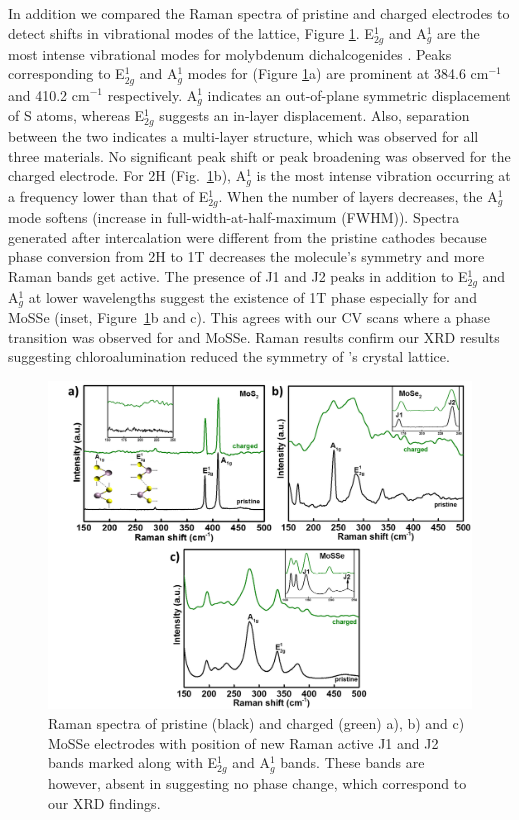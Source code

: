 In addition we compared the Raman spectra of pristine and charged electrodes to detect shifts in vibrational modes of the lattice, Figure \ref{Figures/chap4fig:raman}. E$^1_{2g}$ and A$^1_g$ are the most intense vibrational modes for molybdenum dichalcogenides \cite{yang_pressure-induced_2019, r_2d_2017,sharma_stable_2018}. Peaks corresponding to E$^1_{2g}$ and A$^1_g$ modes for  (Figure \ref{Figures/chap4fig:raman}a) are prominent at 384.6 cm$^{-1}$ and 410.2 cm$^{-1}$ respectively. A$^1_g$ indicates an out-of-plane symmetric displacement of S atoms, whereas E$^1_{2g}$ suggests an in-layer displacement. Also, separation between the two indicates a multi-layer structure, which was observed for all three materials. No significant peak shift or peak broadening was observed for the charged  electrode. For 2H (Fig.\ \ref{Figures/chap4fig:raman}b), A$^1_g$ is the most intense vibration occurring at a frequency lower than that of E$^1_{2g}$. When the number of layers decreases, the A$^1_g$ mode softens (increase in full-width-at-half-maximum (FWHM)). Spectra generated after intercalation were different from the pristine cathodes because phase conversion from 2H to 1T decreases the molecule's symmetry and more Raman bands get active. The presence of J1 and J2 peaks in addition to E$^1_{2g}$ and A$^1_g$ at lower wavelengths suggest the existence of 1T phase especially for  and MoSSe (inset, Figure\ \ref{Figures/chap4fig:raman}b and c). This agrees with our CV scans where a phase transition was observed for  and MoSSe. Raman results confirm our XRD results suggesting chloroalumination reduced the symmetry of 's crystal lattice. 

\begin{figure}[htb!]
\centering
\includegraphics[width=\textwidth]{Figures/chap4fig/raman}
\caption{Raman spectra of pristine (black) and charged (green) a), b)  and c) MoSSe electrodes with position of new Raman active J1 and J2 bands marked along with E$^1_{2g}$ and A$^1_g$ bands. These bands are however, absent in  suggesting no phase change, which correspond to our XRD findings.}
\label{Figures/chap4fig:raman}
\end{figure}


